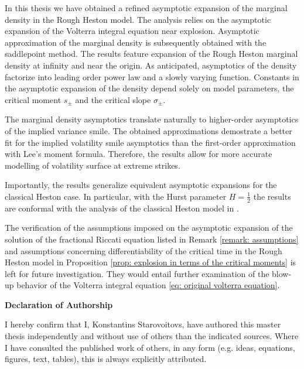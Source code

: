 \documentclass[12pt,twoside]{article}
\theoremstyle{plain}
\theoremstyle{plain}
\theoremstyle{definition}
\theoremstyle{remark}
\numberwithin{equation}{section}
\begin{document}
In this thesis we have obtained a refined asymptotic expansion of the marginal density in the Rough Heston model. The analysis relies on the asymptotic expansion of the Volterra integral equation near explosion. Asymptotic approximation of the marginal density is subsequently obtained with the saddlepoint method. The results feature expansion of the Rough Heston marginal density at infinity and near the origin. As anticipated, asymptotics of the density factorize into leading order power law and a slowly varying function. Constants in the asymptotic expansion of the density depend solely on model parameters, the critical moment $s_\pm$ and the critical slope $\sigma_\pm$.

The marginal density asymptotics translate naturally to higher-order asymptotics of the implied variance smile. The obtained approximations demostrate a better fit for the implied volatility smile asymptotics than the first-order approximation with Lee's moment formula. Therefore, the results allow for more accurate modelling of volatility surface at extreme strikes.

Importantly, the results generalize equivalent asymptotic expansions for the classical Heston case. In particular, with the Hurst parameter $H = \frac 12$ the results are conformal with the analysis of the classical Heston model in \cite{FGGS10}.

The verification of the assumptions imposed on the asymptotic expansion of the solution of the fractional Riccati equation listed in Remark \ref{remark: assumptions} and assumptions concerning differentiability of the critical time in the Rough Heston model in Proposition \ref{prop: explosion in terms of the critical moments} is left for future investigation. They would entail further examination of the blow-up behavior of the Volterra integral equation \eqref{eq: original volterra equation}. 

\newpage

\printbibliography

\newpage

{\Large\textbf{Declaration of Authorship}}

I hereby confirm that I, Konstantins Starovoitovs, have authored this master thesis independently and without use of others than the indicated sources. Where I have consulted the published work of others, in any form (e.g. ideas, equations, figures, text, tables), this is always explicitly attributed.
\vspace{1cm}
\end{document}
